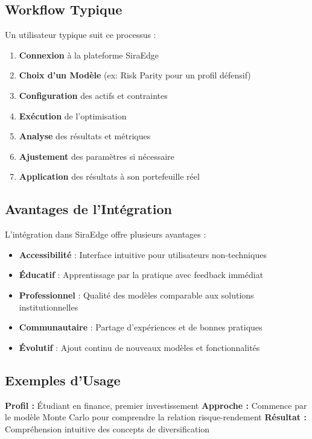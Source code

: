 \documentclass[11pt,a4paper]{article}
\begin{document}
\subsection{Workflow Typique}
Un utilisateur typique suit ce processus :

\begin{enumerate}
\item \textbf{Connexion} à la plateforme SiraEdge
\item \textbf{Choix d'un Modèle} (ex: Risk Parity pour un profil défensif)
\item \textbf{Configuration} des actifs et contraintes
\item \textbf{Exécution} de l'optimisation
\item \textbf{Analyse} des résultats et métriques
\item \textbf{Ajustement} des paramètres si nécessaire
\item \textbf{Application} des résultats à son portefeuille réel
\end{enumerate}

\subsection{Avantages de l'Intégration}
L'intégration dans SiraEdge offre plusieurs avantages :

\begin{itemize}
\item \textbf{Accessibilité} : Interface intuitive pour utilisateurs non-techniques
\item \textbf{Éducatif} : Apprentissage par la pratique avec feedback immédiat
\item \textbf{Professionnel} : Qualité des modèles comparable aux solutions institutionnelles
\item \textbf{Communautaire} : Partage d'expériences et de bonnes pratiques
\item \textbf{Évolutif} : Ajout continu de nouveaux modèles et fonctionnalités
\end{itemize}

\subsection{Exemples d'Usage}
\begin{tcolorbox}[title=Exemple 1 - Investisseur Débutant]
\textbf{Profil :} Étudiant en finance, premier investissement
\textbf{Approche :} Commence par le modèle Monte Carlo pour comprendre la relation risque-rendement
\textbf{Résultat :} Compréhension intuitive des concepts de diversification
\end{tcolorbox}
\end{document}
